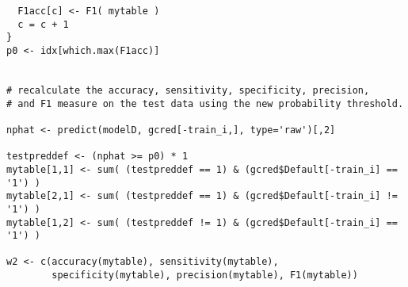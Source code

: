 \documentclass[11pt]{article}
\begin{document}
\begin{Verbatim}
  F1acc[c] <- F1( mytable )
  c = c + 1
}
p0 <- idx[which.max(F1acc)]


# recalculate the accuracy, sensitivity, specificity, precision, 
# and F1 measure on the test data using the new probability threshold.

nphat <- predict(modelD, gcred[-train_i,], type='raw')[,2]

testpreddef <- (nphat >= p0) * 1
mytable[1,1] <- sum( (testpreddef == 1) & (gcred$Default[-train_i] == '1') )
mytable[2,1] <- sum( (testpreddef == 1) & (gcred$Default[-train_i] != '1') )
mytable[1,2] <- sum( (testpreddef != 1) & (gcred$Default[-train_i] == '1') )

w2 <- c(accuracy(mytable), sensitivity(mytable), 
        specificity(mytable), precision(mytable), F1(mytable))
\end{Verbatim}
\end{document}
